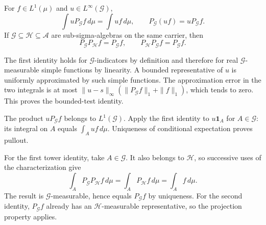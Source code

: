 \begin{proposition}
\label{prop:conditional_expectation_rules}
For $f\in L^1(\mu)$ and $u\in L^\infty(\mathcal G)$,
\[
\int uP_{\mathcal G}f\,d\mu=\int uf\,d\mu,
\qquad
P_{\mathcal G}(uf)=uP_{\mathcal G}f.
\]
If $\mathcal G\subseteq\mathcal H\subseteq\mathcal A$ are
sub-sigma-algebras on the same carrier, then
\[
P_{\mathcal G}P_{\mathcal H}f=P_{\mathcal G}f,
\qquad P_{\mathcal H}P_{\mathcal G}f=P_{\mathcal G}f.
\]
\end{proposition}
\Proof
The first identity holds for $\mathcal G$-indicators by definition and
therefore for real $\mathcal G$-measurable simple functions by linearity.
A bounded representative of $u$ is uniformly approximated by such
simple functions. The approximation error in the two integrals is at
most $\|u-s\|_\infty(\|P_{\mathcal G}f\|_1+\|f\|_1)$,
which tends to zero. This proves the bounded-test identity.

The product $uP_{\mathcal G}f$ belongs to $L^1(\mathcal G)$.
Apply the first identity to $u\mathbf1_A$ for $A\in\mathcal G$:
its integral on $A$ equals $\int_A uf\,d\mu$. Uniqueness of
conditional expectation proves pullout.

For the first tower identity, take $A\in\mathcal G$. It also belongs
to $\mathcal H$, so successive uses of the characterization give
\[
\int_A P_{\mathcal G}P_{\mathcal H}f\,d\mu
 =\int_A P_{\mathcal H}f\,d\mu=\int_A f\,d\mu.
\]
The result is $\mathcal G$-measurable, hence equals
$P_{\mathcal G}f$ by uniqueness. For the second identity,
$P_{\mathcal G}f$ already has an $\mathcal H$-measurable
representative, so the projection property applies.
\Done

